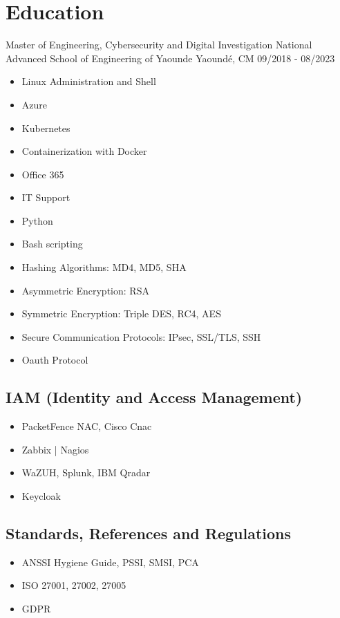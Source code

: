 \section{Education}
\cventry
{Master of Engineering, Cybersecurity and Digital Investigation} %
{National Advanced School of Engineering of Yaounde} %
{Yaoundé, CM} %
{09/2018 - 08/2023} %
\begin{multicols}{2}

\begin{itemize}
  \item Linux Administration and Shell
  \item Azure
  \item Kubernetes
  \item Containerization with Docker
  \item Office 365
  \item IT Support
  \item Python
  \item Bash scripting
\end{itemize}
\begin{itemize}
  \item Hashing Algorithms: MD4, MD5, SHA
  \item Asymmetric Encryption: RSA 
  \item Symmetric Encryption: Triple DES, RC4, AES
  \item Secure Communication Protocols: IPsec, SSL/TLS, SSH
  \item Oauth Protocol
\end{itemize}

\subsection*{IAM (Identity and Access Management)}
\begin{itemize}
  \item PacketFence NAC, Cisco Cnac 
  \item Zabbix | Nagios
  \item WaZUH, Splunk, IBM Qradar
  \item Keycloak
\end{itemize}

\subsection*{Standards, References and Regulations}
\begin{itemize}
  \item ANSSI Hygiene Guide, PSSI, SMSI, PCA
  \item ISO 27001, 27002, 27005
  \item GDPR
\end{itemize}


\end{multicols}
